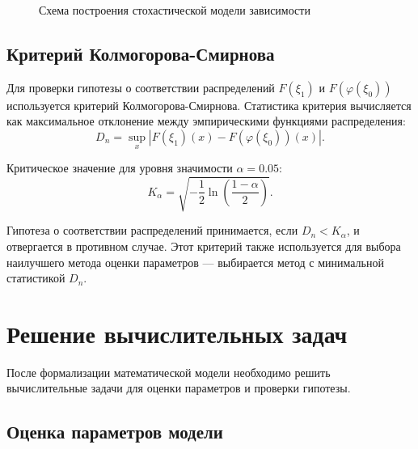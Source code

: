 \documentclass[a4paper, 14pt]{extarticle}
\begin{document}
\begin{figure}[H]
  \caption{Схема построения стохастической модели зависимости}
  \label{fig:model_scheme}
\end{figure}

\subsection{Критерий Колмогорова-Смирнова}

Для проверки гипотезы о соответствии распределений $F(\xi_1)$ и $F(\varphi(\xi_0))$ используется критерий Колмогорова-Смирнова. Статистика критерия вычисляется как максимальное отклонение между эмпирическими функциями распределения:
\[
D_n = \sup_x |F(\xi_1)(x) - F(\varphi(\xi_0))(x)|.
\]

Критическое значение для уровня значимости $\alpha = 0.05$:
\[
K_{\alpha} = \sqrt{-\frac{1}{2} \ln\left(\frac{1-\alpha}{2}\right)}.
\]

Гипотеза о соответствии распределений принимается, если $D_n < K_{\alpha}$, и отвергается в противном случае. Этот критерий также используется для выбора наилучшего метода оценки параметров --- выбирается метод с минимальной статистикой $D_n$.

\section{Решение вычислительных задач}

После формализации математической модели необходимо решить вычислительные задачи для оценки параметров и проверки гипотезы.

\subsection{Оценка параметров модели}
\end{document}
